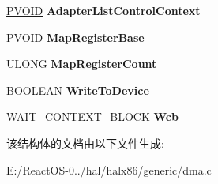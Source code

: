 \begin{DoxyCompactItemize}
\hyperlink{interfacevoid}{P\+V\+O\+ID} {\bfseries Adapter\+List\+Control\+Context}
\item 
\mbox{\label{struct___s_c_a_t_t_e_r___g_a_t_h_e_r___c_o_n_t_e_x_t_aa6ded57cdeab96eee4f9273687ac14d0}} 
\hyperlink{interfacevoid}{P\+V\+O\+ID} {\bfseries Map\+Register\+Base}
\item 
\mbox{\label{struct___s_c_a_t_t_e_r___g_a_t_h_e_r___c_o_n_t_e_x_t_a34506afab17104df7d37e912f5c797fb}} 
U\+L\+O\+NG {\bfseries Map\+Register\+Count}
\item 
\mbox{\label{struct___s_c_a_t_t_e_r___g_a_t_h_e_r___c_o_n_t_e_x_t_ab28c1594cea67ee41ee2024724746a43}} 
\hyperlink{_processor_bind_8h_a112e3146cb38b6ee95e64d85842e380a}{B\+O\+O\+L\+E\+AN} {\bfseries Write\+To\+Device}
\item 
\mbox{\label{struct___s_c_a_t_t_e_r___g_a_t_h_e_r___c_o_n_t_e_x_t_a3b089a42fe1903d9d5d6e06691574859}} 
\hyperlink{struct___w_a_i_t___c_o_n_t_e_x_t___b_l_o_c_k}{W\+A\+I\+T\+\_\+\+C\+O\+N\+T\+E\+X\+T\+\_\+\+B\+L\+O\+CK} {\bfseries Wcb}
\end{DoxyCompactItemize}


该结构体的文档由以下文件生成\+:\begin{DoxyCompactItemize}
\item 
E\+:/\+React\+O\+S-\/0../hal/halx86/generic/dma.\+c\end{DoxyCompactItemize}
